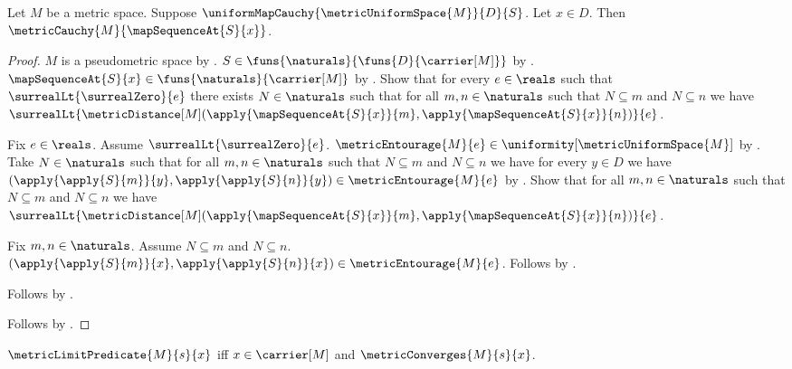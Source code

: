 \begin{theorem}\label{uniform_map_cauchy_implies_point_sequence_cauchy}
    Let $M$ be a metric space.
    Suppose $\uniformMapCauchy{\metricUniformSpace{M}}{D}{S}$.
    Let $x\in D$.
    Then $\metricCauchy{M}{\mapSequenceAt{S}{x}}$.
\end{theorem}
\begin{proof}
    $M$ is a pseudometric space by
        .
    $S\in\funs{\naturals}{\funs{D}{\carrier[M]}}$
        by .
    $\mapSequenceAt{S}{x}\in\funs{\naturals}{\carrier[M]}$
        by .
    Show that for every $e\in\reals$ such that
        $\surrealLt{\surrealZero}{e}$ there exists $N\in\naturals$
        such that for all $m,n\in\naturals$ such that
            $N\subseteq m$ and $N\subseteq n$ we have
            $\surrealLt{\metricDistance[M]
                (\apply{\mapSequenceAt{S}{x}}{m},
                 \apply{\mapSequenceAt{S}{x}}{n})}{e}$.
    \begin{subproof}
        Fix $e\in\reals$.
        Assume $\surrealLt{\surrealZero}{e}$.
        $\metricEntourage{M}{e}\in
            \uniformity[\metricUniformSpace{M}]$
            by
            .
        Take $N\in\naturals$ such that for all $m,n\in\naturals$
            such that $N\subseteq m$ and $N\subseteq n$ we have
            for every $y\in D$ we have
            $(\apply{\apply{S}{m}}{y},
             \apply{\apply{S}{n}}{y})\in\metricEntourage{M}{e}$
            by .
        Show that for all $m,n\in\naturals$ such that
            $N\subseteq m$ and $N\subseteq n$ we have
            $\surrealLt{\metricDistance[M]
                (\apply{\mapSequenceAt{S}{x}}{m},
                 \apply{\mapSequenceAt{S}{x}}{n})}{e}$.
        \begin{subproof}
            Fix $m,n\in\naturals$.
            Assume $N\subseteq m$ and $N\subseteq n$.
            $(\apply{\apply{S}{m}}{x},
             \apply{\apply{S}{n}}{x})\in\metricEntourage{M}{e}$.
            Follows by
                .
        \end{subproof}
        Follows by \auto.
    \end{subproof}
    Follows by .
\end{proof}

\begin{definition}\label{metric_limit_predicate}
    $\metricLimitPredicate{M}{s}{x}$ iff
        $x\in\carrier[M]$ and $\metricConverges{M}{s}{x}$.
\end{definition}

